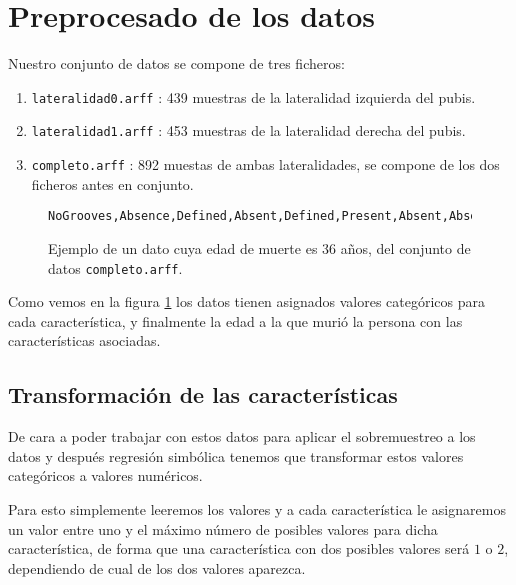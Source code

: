 \section{Preprocesado de los datos}

Nuestro conjunto de datos se compone de tres ficheros:

\begin{enumerate}
	\item \texttt{lateralidad0.arff} : 439 muestras de la lateralidad izquierda del pubis.
	\item \texttt{lateralidad1.arff} : 453 muestras de la lateralidad derecha del pubis.
	\item \texttt{completo.arff} : 892 muestas de ambas lateralidades, se compone de los dos ficheros antes en conjunto.
\end{enumerate}

\begin{figure}[H]
	\begin{lstlisting}[language={}]
	NoGrooves,Absence,Defined,Absent,Defined,Present,Absent,Absent,FormedWithoutRarefactions,36
	\end{lstlisting}
	\caption{Ejemplo de un dato cuya edad de muerte es 36 años, del conjunto de datos \texttt{completo.arff}.}
	\label{fig:ejemplo_dato}
\end{figure}

Como vemos en la figura \ref{fig:ejemplo_dato} los datos tienen asignados valores categóricos para cada característica, y finalmente la edad a la que murió la persona con las características asociadas.

\subsection{Transformación de las características}

De cara a poder trabajar con estos datos para aplicar el sobremuestreo a los datos y después regresión simbólica tenemos que transformar estos valores categóricos a valores numéricos.

Para esto simplemente leeremos los valores y a cada característica le asignaremos un valor entre uno y el máximo número de posibles valores para dicha característica, de forma que una característica con dos posibles valores será $1$ o $2$, dependiendo de cual de los dos valores aparezca.


